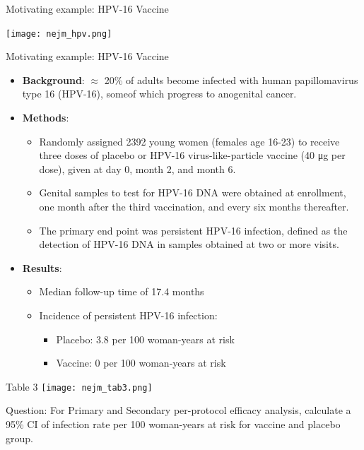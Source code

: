 \documentclass[10pt]{beamer}\usepackage[]{graphicx}\usepackage[]{color}
\begin{document}
\begin{frame}{Motivating example: HPV-16 Vaccine}
	
	\texttt{[image: nejm\_hpv.png]}
	
\end{frame}


\begin{frame}{Motivating example: HPV-16 Vaccine}
	\footnotesize
	\begin{itemize}
		\item \textbf{Background}: $\approx$ 20\% of adults become infected with human papillomavirus type 16 (HPV-16), someof which progress to anogenital cancer. 
		\pause
		\item \textbf{Methods}: 
		\begin{itemize}
			\footnotesize
			\item Randomly assigned 2392 young women (females age 16-23) to receive three doses of placebo or HPV-16 virus-like-particle vaccine (40 μg per dose), given at day 0, month 2, and month 6. 
			\item Genital samples to test for HPV-16 DNA were obtained at enrollment,	one month after the third vaccination, and every six months thereafter. 
			\item The primary end point was persistent HPV-16 infection, defined as the detection of HPV-16 DNA in samples obtained at two or more visits. 
		\end{itemize}
		\pause 
		\item \textbf{Results}: \begin{itemize}
			\footnotesize
			\item Median follow-up time of 17.4 months
			\item Incidence of persistent HPV-16 infection: \begin{itemize}
				\footnotesize
				\item Placebo: 3.8 per 100 woman-years at risk
				\item Vaccine: 0 per 100 woman-years at risk
			\end{itemize}
		\end{itemize}
	\end{itemize}
\end{frame}


\begin{frame}{Table 3}
	\texttt{[image: nejm\_tab3.png]}
	
	\vspace{0.5in}
	\alert{Question}: For Primary and Secondary per-protocol efficacy analysis, calculate a 95\% CI of infection rate per 100 woman-years at risk for vaccine and placebo group.
	
\end{frame}
\end{document}
